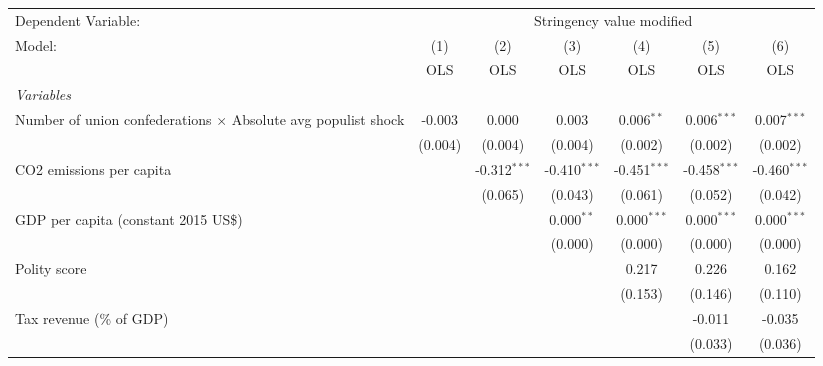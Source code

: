 
\begingroup
\centering
\begin{tabular}{lcccccc}
   \toprule
   Dependent Variable: & \multicolumn{6}{c}{Stringency value modified}\\
   Model:                                                               & (1)     & (2)            & (3)            & (4)            & (5)            & (6)\\  
                                                                        &  OLS    & OLS            & OLS            & OLS            & OLS            & OLS\\  
   \midrule
   \emph{Variables}\\
   Number of union confederations $\times$ Absolute avg populist shock  & -0.003  & 0.000          & 0.003          & 0.006$^{**}$   & 0.006$^{***}$  & 0.007$^{***}$\\   
                                                                        & (0.004) & (0.004)        & (0.004)        & (0.002)        & (0.002)        & (0.002)\\   
   CO2 emissions per capita                                             &         & -0.312$^{***}$ & -0.410$^{***}$ & -0.451$^{***}$ & -0.458$^{***}$ & -0.460$^{***}$\\   
                                                                        &         & (0.065)        & (0.043)        & (0.061)        & (0.052)        & (0.042)\\   
   GDP per capita (constant 2015 US\$)                                  &         &                & 0.000$^{**}$   & 0.000$^{***}$  & 0.000$^{***}$  & 0.000$^{***}$\\   
                                                                        &         &                & (0.000)        & (0.000)        & (0.000)        & (0.000)\\   
   Polity score                                                         &         &                &                & 0.217          & 0.226          & 0.162\\   
                                                                        &         &                &                & (0.153)        & (0.146)        & (0.110)\\   
   Tax revenue (\% of GDP)                                              &         &                &                &                & -0.011         & -0.035\\   
                                                                        &         &                &                &                & (0.033)        & (0.036)\\   

\end{tabular}
